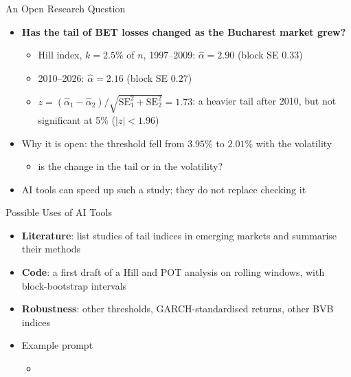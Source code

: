 \begin{frame}{An Open Research Question}
\itemsize{\small}
\begin{itemize}
    \item \textbf{Has the tail of BET losses changed as the Bucharest market grew?}
    \begin{itemize}
        \item Hill index, $k = 2.5\%$ of $n$, 1997--2009: $\hat\alpha = 2.90$ (block SE $0.33$)
        \item 2010--2026: $\hat\alpha = 2.16$ (block SE $0.27$)
        \item $z = (\hat\alpha_1 - \hat\alpha_2)/\sqrt{\mathrm{SE}_1^2 + \mathrm{SE}_2^2} = 1.73$: a heavier tail after 2010, but not significant at 5\% ($|z| < 1.96$)
    \end{itemize}
    \item Why it is open: the threshold fell from $3.95\%$ to $2.01\%$ with the volatility
    \begin{itemize}
        \item is the change in the tail or in the volatility?
    \end{itemize}
    \item AI tools can speed up such a study; they do not replace checking it 
\end{itemize}
\end{frame}

\begin{frame}{Possible Uses of AI Tools}
\itemsize{\small}
\begin{itemize}
    \item \textbf{Literature}: list studies of tail indices in emerging markets and summarise their methods
    \item \textbf{Code}: a first draft of a Hill and POT analysis on rolling windows, with block-bootstrap intervals
    \item \textbf{Robustness}: other thresholds, GARCH-standardised returns, other BVB indices
    \item Example prompt
    \begin{itemize}
        \item {}
    \end{itemize}
\end{itemize}
\end{frame}


